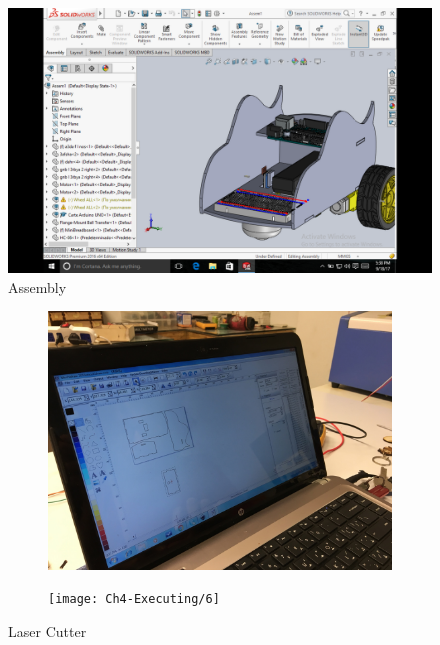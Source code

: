 \documentclass[11pt]{report}
\begin{document}
		\begin{figure}
			\begin{center}
				\includegraphics[scale=0.2]{Ch4-Executing/7}
				\caption{Assembly}
			\end{center}
			
		\end{figure}
		
		\begin{figure}[]
			\begin{center}
				\begin{subfigure}[normal]{0.5\textwidth}
					\includegraphics[scale=0.12]{Ch4-Executing/5}
					\caption{}
					\label{A}
					
					\texttt{[image: Ch4-Executing/6]}
					\caption{}
					\label{B}	
				\end{subfigure}
				\caption{Laser Cutter}
			\end{center}
		\end{figure}
\end{document}
